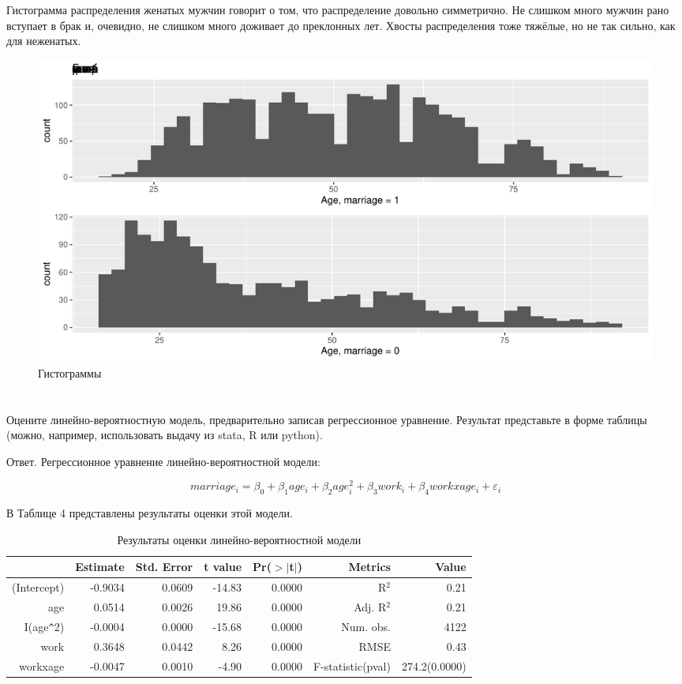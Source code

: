 \documentclass[a4paper,12pt]{article}
\def \e{\varepsilon}
\def \e{\varepsilon}
\begin{document}
Гистограмма распределения женатых мужчин говорит о том, что распределение довольно симметрично. Не слишком много мужчин рано вступает в брак и, очевидно, не слишком много доживает до преклонных лет. Хвосты распределения тоже тяжёлые, но не так сильно, как для неженатых.
\begin{figure}[!h]
	\includegraphics[width=\linewidth]{Histograms}
	\caption{Гистограммы \label{his}}
\end{figure}

\section{}


\subsection{}

\Sun Оцените линейно-вероятностную модель, предварительно записав
регрессионное уравнение. Результат представьте в форме таблицы (можно, например,
использовать выдачу из stata, R или python).


Ответ. Регрессионное уравнение линейно-вероятностной модели:

\[ marriage_i = \beta_0 + \beta_1 age_i + \beta_2 age_i^2 + \beta_3 work_i + \beta_4 workxage_i + \e_i \]

В Таблице 4 представлены результаты оценки этой модели.
\begin{table}[ht]
	\centering
	\begin{tabular}{|rrrrr|rr|}
		\hline
		& Estimate & Std. Error & t value & Pr($>$$|$t$|$) & Metrics & Value \\ 
		\hline
		(Intercept) & -0.9034 & 0.0609 & -14.83 & 0.0000 &R$^2$       & 0.21   \\ 
		age & 0.0514 & 0.0026 & 19.86 & 0.0000 & Adj. R$^2$  & 0.21    \\ 
		I(age\verb|^|2) & -0.0004 & 0.0000 & -15.68 & 0.0000 & Num. obs.   & 4122     \\ 
		work & 0.3648 & 0.0442 & 8.26 & 0.0000 & 	RMSE        & 0.43   \\ 
		workxage & -0.0047 & 0.0010 & -4.90 & 0.0000 &	F-statistic(pval)  &274.2(0.0000) \\
		\hline

	\end{tabular}
\caption{Результаты оценки линейно-вероятностной модели}
\end{table}
\end{document}
